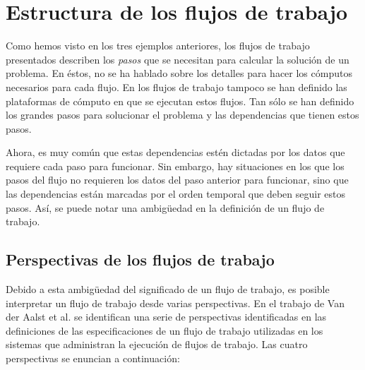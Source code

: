 \section{Estructura de los flujos de trabajo}
Como hemos visto en los tres ejemplos anteriores, los flujos de trabajo presentados describen los \emph{pasos} que se necesitan para calcular la solución de un problema. En éstos, no se ha hablado sobre los detalles para hacer los cómputos necesarios para cada flujo. En los flujos de trabajo tampoco se han definido las plataformas de cómputo en que se ejecutan estos flujos. Tan sólo se han definido los grandes pasos para solucionar el problema y las dependencias que tienen estos pasos. 

Ahora, es muy común que estas dependencias estén dictadas por los datos que requiere cada paso para funcionar. Sin embargo, hay situaciones en los que los pasos del flujo no requieren los datos del paso anterior para funcionar, sino que las dependencias están marcadas por el orden temporal que deben seguir estos pasos. Así, se puede notar una ambigüedad en la definición de un flujo de trabajo.

\subsection{Perspectivas de los flujos de trabajo}
Debido a esta ambigüedad del significado de un flujo de trabajo, es posible interpretar un flujo de trabajo desde varias perspectivas. En el trabajo de Van der Aalst et al. \cite{van2003workflow} se identifican una serie de perspectivas identificadas en las definiciones de las especificaciones de un flujo de trabajo utilizadas en los sistemas que administran la ejecución de flujos de trabajo. Las cuatro perspectivas se enuncian a continuación:

